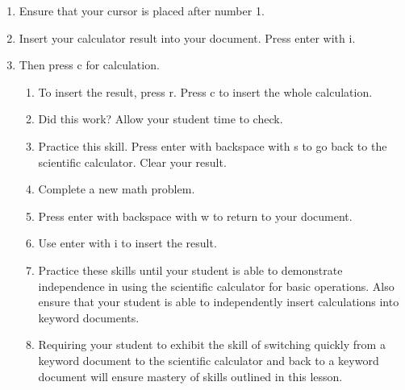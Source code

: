 \documentclass[10pt,letterpaper,twoside]{report}
\begin{document}
{{{\begin{enumerate}
	\item Ensure that your cursor is placed after number 1.
	\item Insert your calculator result into your document.  Press enter with i.
	\item Then press c for calculation.
	      \begin{enumerate}
		      \item To insert the result, press r.  Press c to insert the whole calculation.
		      \item Did this work? Allow your student time to check.
		      \item Practice this skill.  Press enter with backspace with s to go back to the scientific calculator.  Clear your result.
		      \item Complete a new math problem.
		      \item Press enter with backspace with w to return to your document.
		      \item Use enter with i to insert the result.
		      \item Practice these skills until your student is able to demonstrate independence in using the scientific calculator for basic operations.  Also ensure that your student is able to independently insert calculations into keyword documents.
		      \item Requiring your student to exhibit the skill of switching quickly from a keyword document to the scientific calculator and back to a keyword document will ensure mastery of skills outlined in this lesson.
	      \end{enumerate}
\end{enumerate}
\clearpage
}}}
\end{document}
